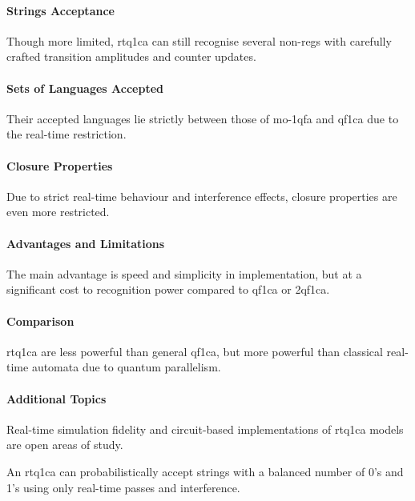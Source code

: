 \paragraph{Strings Acceptance}
Though more limited, \gls{rtq1ca} can still recognise several non-\glspl{reg} with carefully crafted transition amplitudes and counter updates.

\paragraph{Sets of Languages Accepted}
Their accepted languages lie strictly between those of \gls{mo-1qfa} and \gls{qf1ca} due to the real-time restriction.

\paragraph{Closure Properties}
Due to strict real-time behaviour and interference effects, closure properties are even more restricted.

\paragraph{Advantages and Limitations}
The main advantage is speed and simplicity in implementation, but at a significant cost to recognition power compared to \gls{qf1ca} or \gls{2qf1ca}.

\paragraph{Comparison}
\gls{rtq1ca} are less powerful than general \gls{qf1ca}, but more powerful than classical real-time automata due to quantum parallelism.

\paragraph{Additional Topics}
Real-time simulation fidelity and circuit-based implementations of \gls{rtq1ca} models are open areas of study.

\begin{example}
An \gls{rtq1ca} can probabilistically accept strings with a balanced number of 0's and 1's using only real-time passes and interference.
\end{example}